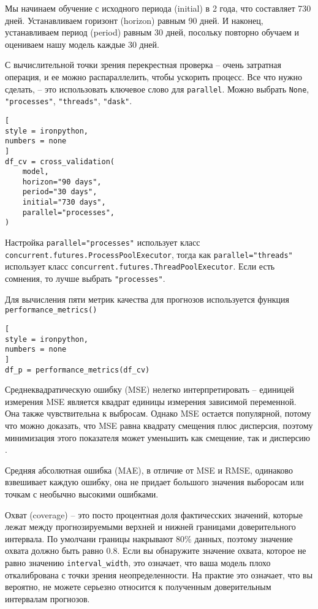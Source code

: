 \documentclass[%
	11pt,
	a4paper,
	utf8,
		]{article}
\begin{document}
Мы начинаем обучение с исходного периода (initial) в 2 года, что составляет 730 дней. Устанавливаем горизонт (horizon) равным 90 дней. И наконец, устанавливаем период (period) равным 30 дней, посольку повторно обучаем и оцениваем нашу модель каждые 30 дней.

С вычислительной точки зрения перекрестная проверка -- очень затратная операция, и ее можно распараллелить, чтобы ускорить процесс. Все что нужно сделать, -- это использовать ключевое слово для \verb|parallel|. Можно выбрать \verb|None|, \verb|"processes"|, \verb|"threads"|, \verb|"dask"|.
\begin{lstlisting}[
style = ironpython,
numbers = none
]
df_cv = cross_validation(
    model,
    horizon="90 days",
    period="30 days",
    initial="730 days",
    parallel="processes",
)
\end{lstlisting}

Настройка \verb|parallel="processes"| использует класс \verb|concurrent.futures.ProcessPoolExecutor|, тогда как \verb|parallel="threads"| использует класс \verb|concurrent.futures.ThreadPoolExecutor|. Если есть сомнения, то лучше выбрать \verb|"processes"|.

Для вычисления пяти метрик качества для прогнозов используется функция \verb|performance_metrics()|
\begin{lstlisting}[
style = ironpython,
numbers = none
]
df_p = performance_metrics(df_cv)
\end{lstlisting}

Среднеквадратическую ошибку (MSE) нелегко интерпретировать -- единицей измерения MSE является квадрат единицы измерения зависимой переменной. Она также чувствительна к выбросам. Однако MSE остается популярной, потому что можно доказать, что MSE равна квадрату смещения плюс дисперсия, поэтому минимизация этого показателя может уменьшить как смещение, так и дисперсию \cite[]{gruzdev:time-series-2022}.

Средняя абсолютная ошибка (MAE), в отличие от MSE и RMSE, одинаково взвешивает каждую ошибку, она не придает большого значения выборосам или точкам с необычно высокими ошибками.

Охват (coverage) -- это посто процентная доля фактичесских значений, которые лежат между прогнозируемыми верхней и нижней границами доверительного интервала. По умолчани границы накрывают 80\% данных, поэтому значение охвата должно быть равно 0.8. Если вы обнаружите значение охвата, которое не равно значению \verb|interval_width|, это означает, что ваша модель плохо откалибрована с точки зрения неопределенности. На практие это означает, что вы вероятно, не можете серьезно относится к полученным доверительным интервалам прогнозов.
\end{document}
